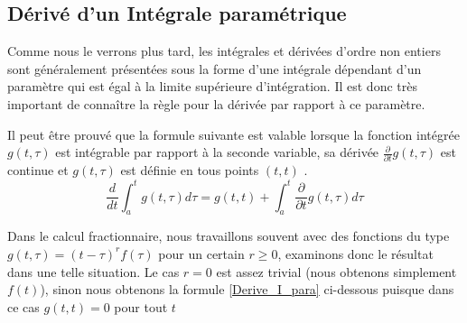 {\begin{minipage}[t]{.5\textwidth}
\begin{flushright}
{
        }%
    \end{flushright}
\end{minipage}
}
\subsection*{Dérivé d'un Intégrale paramétrique}
Comme nous le verrons plus tard, les intégrales et dérivées d'ordre non entiers sont généralement présentées sous la forme d'une intégrale dépendant d'un paramètre qui est égal à la limite supérieure d'intégration. Il est donc très important de connaître la règle pour la dérivée par rapport à ce paramètre.

Il peut être prouvé que la formule suivante est valable lorsque la fonction intégrée $g(t, \tau)$ est intégrable par rapport à la seconde variable, sa dérivée $ \frac{\partial}{\partial t} g(t, \tau) $ est continue et $g(t, \tau)$ est définie en tous points $(t, t)$ .
\begin{equation*}
    \frac{d}{dt}\int_{a}^{t} g(t,\tau) d\tau = g(t,t) + \int_{a}^{t} \frac{\partial}{\partial t} g(t,\tau) d\tau
\end{equation*}

Dans le calcul fractionnaire, nous travaillons souvent avec des fonctions du type $g(t, \tau) = (t-\tau)^{r} f(\tau) $ pour un certain $r \geq 0$, examinons donc le résultat dans une telle situation. Le cas $r = 0$ est assez trivial (nous obtenons simplement $f(t)$), sinon nous obtenons la formule \ref{Derive_I_para} ci-dessous puisque dans ce cas $g(t, t) = 0$ pour tout $t$

